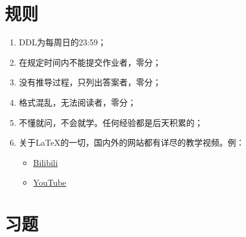 \documentclass[12pt,hyperref,a4paper,UTF8]{ctexart}
\begin{document}
\cover

%
%

\thispagestyle{empty} %

\newpage
\tableofcontents

\newpage


\section{规则}
\begin{enumerate}[I]
    \item DDL为每周日的23:59；
    
    \item 在规定时间内不能提交作业者，零分；

    \item 没有推导过程，只列出答案者，零分；

    \item 格式混乱，无法阅读者，零分；

    \item 不懂就问，不会就学。任何经验都是后天积累的；

    \item 关于LaTeX的一切，国内外的网站都有详尽的教学视频。例：
    \begin{itemize}
        \item \href{https://www.bilibili.com/video/BV1Jy4y1p76e/?vd_source=2c0f6624843da61e86c7e8a2b75de875}{Bilibili}

        \item \href{https://www.youtube.com/watch?v=Jp0lPj2-DQA&list=PLHXZ9OQGMqxcWWkx2DMnQmj5os2X5ZR73}{YouTube}
    \end{itemize}
\end{enumerate}

\newpage

\section{习题}
\end{document}

